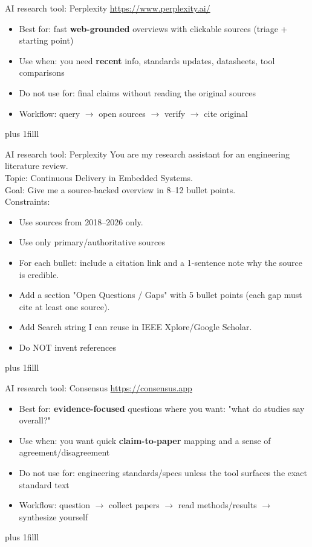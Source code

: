 \documentclass[aspectratio=169]{beamer}
\newcommand{\btVFill}{\vskip0pt plus 1filll}
\begin{document}

\begin{frame}{AI research tool: Perplexity}
  \url{https://www.perplexity.ai/}\\
  \bigskip
\begin{itemize}
  \item Best for: fast \textbf{web-grounded} overviews with clickable sources (triage + starting point)
  \item Use when: you need \textbf{recent} info, standards updates, datasheets, tool comparisons
  \item Do not use for: final claims without reading the original sources
  \item Workflow: query $\rightarrow$ open sources $\rightarrow$ verify $\rightarrow$ cite original
\end{itemize}
\btVFill\end{frame}

\begin{frame}{AI research tool: Perplexity}
You are my research assistant for an engineering literature review.\\
Topic: Continuous Delivery in Embedded Systems.\\
Goal: Give me a source-backed overview in 8--12 bullet points.\\
Constraints:
\begin{itemize}
  \item   Use sources from 2018--2026 only.
\item Use only primary/authoritative sources
\item For each bullet: include a citation link and a 1-sentence note why the source is credible.
\item Add a section "Open Questions / Gaps" with 5 bullet points (each gap must cite at least one source).
\item Add Search string I can reuse in IEEE Xplore/Google Scholar.
\item Do NOT invent references\end{itemize}
 \btVFill
\end{frame}


\begin{frame}{AI research tool: Consensus}
  \url{https://consensus.app}\\
    \bigskip
\begin{itemize}
  \item Best for: \textbf{evidence-focused} questions where you want: "what do studies say overall?"
  \item Use when: you want quick \textbf{claim-to-paper} mapping and a sense of agreement/disagreement
  \item Do not use for: engineering standards/specs unless the tool surfaces the exact standard text
  \item Workflow: question $\rightarrow$ collect papers $\rightarrow$ read methods/results $\rightarrow$ synthesize yourself
\end{itemize}
\btVFill\end{frame}
\end{document}
